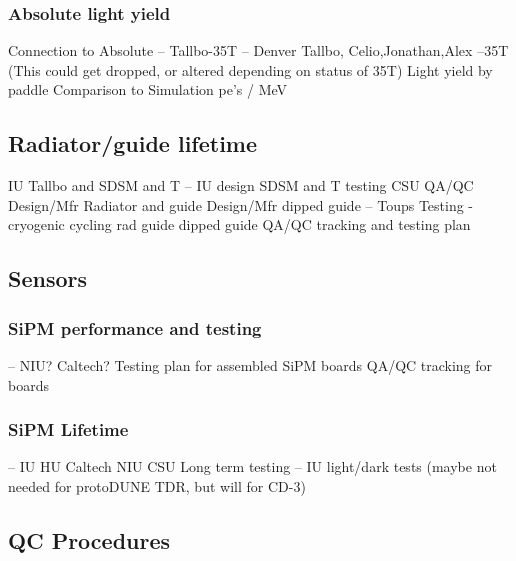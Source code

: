 \subsubsection{ Absolute light yield}
     Connection to Absolute -- Tallbo-35T  -- Denver Tallbo, Celio,Jonathan,Alex --35T
     (This could get dropped, or altered depending on status of 35T)
     Light yield by paddle
     Comparison to Simulation
     pe's / MeV 

\subsection{Radiator/guide lifetime}
     IU Tallbo and SDSM and T  -- IU design SDSM and T testing  CSU QA/QC
     Design/Mfr Radiator and guide
     Design/Mfr dipped guide -- Toups
     Testing - cryogenic cycling 
          rad
          guide
          dipped guide
     QA/QC tracking and testing plan  

\subsection{Sensors}

\subsubsection{SiPM performance and testing}
      -- NIU? Caltech?
     Testing plan for assembled SiPM boards
     QA/QC tracking for boards     

\subsubsection{SiPM Lifetime}
      -- IU HU Caltech NIU CSU 
     Long term testing -- IU light/dark tests     
     (maybe not needed for protoDUNE TDR, but will for CD-3)


\subsection{QC Procedures}



